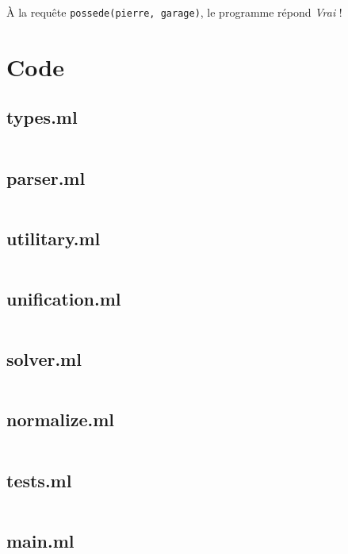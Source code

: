 \documentclass{article}
\newcommand\codefile[1]{\subsection{#1}\inputminted{ocaml}{../Code/#1}}
\begin{document}
À la requête \texttt{possede(pierre,\ garage)}, le programme répond
\emph{Vrai} !




\appendix

\section{Code}
\codefile{types.ml}
\codefile{parser.ml}
\codefile{utilitary.ml}
\codefile{unification.ml}
\codefile{solver.ml}
\codefile{normalize.ml}
\codefile{tests.ml}
\codefile{main.ml}
\end{document}
